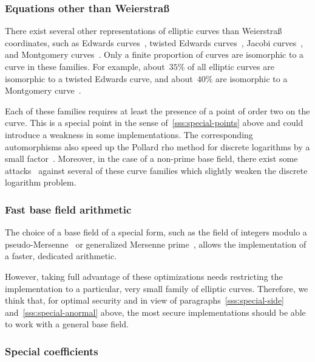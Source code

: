 \documentclass[twocolumn,letterpaper,10pt]{article}
\begin{document}
\subsubsection{Equations other than Weierstraß}
\label{sss:other-eq}

There exist several other representations of elliptic curves
than Weierstraß coordinates, such as
Edwards curves~\cite{ams2007edwards},
twisted Edwards curves~\cite{africa2008bbjl},
Jacobi curves~\cite{aaaaec2003bj},
and Montgomery curves~\cite{mc1987montgomery}.
Only a finite proportion of curves are isomorphic
to a curve in these families.
For example, about~$35\%$ of all elliptic curves
are isomorphic to a twisted Edwards curve,
and about~$40\%$ are isomorphic to a Montgomery curve~\cite{sac2011plut}.

Each of these families requires at least
the presence of a point of order two on the curve.
This is a special point in the sense of~\ref{sss:special-points} above
and could introduce a weakness in some implementations.
The corresponding automorphisms also speed up the Pollard rho
method for discrete logarithms by a small factor~\cite{moc2000glv}.
Moreover, in the case of a non-prime base field,
there exist some attacks~\cite{jc2014fghr}
against several of these curve families
which slightly weaken the discrete logarithm problem.

\subsubsection{Fast base field arithmetic}
\label{sss:special-fast}

The choice of a base field of a special form,
such as the field of integers modulo
a pseudo-Mersenne~\cite{pkc2006bernstein}
or generalized Mersenne prime~\cite{nist2000fips186-2},
allows the implementation of a faster, dedicated arithmetic.

However, taking full advantage of these optimizations
needs restricting the implementation to a particular, very small
family of elliptic curves.
Therefore, we think that, for optimal security and in view of
paragraphs~\ref{sss:special-side} and~\ref{sss:special-anormal} above,
the most secure implementations should be able to work with
a general base field.

\subsubsection{Special coefficients}
\label{sss:special-coeff}
\end{document}
